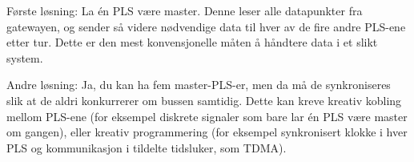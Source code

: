 \vskip 10pt

Første løsning: La én PLS være master. Denne leser alle datapunkter fra gatewayen, og sender så videre nødvendige data til hver av de fire andre PLS-ene etter tur. Dette er den mest konvensjonelle måten å håndtere data i et slikt system.

\vskip 10pt

Andre løsning: Ja, du kan ha fem master-PLS-er, men da må de synkroniseres slik at de aldri konkurrerer om bussen samtidig. Dette kan kreve kreativ kobling mellom PLS-ene (for eksempel diskrete signaler som bare lar én PLS være master om gangen), eller kreativ programmering (for eksempel synkronisert klokke i hver PLS og kommunikasjon i tildelte tidsluker, som TDMA).


